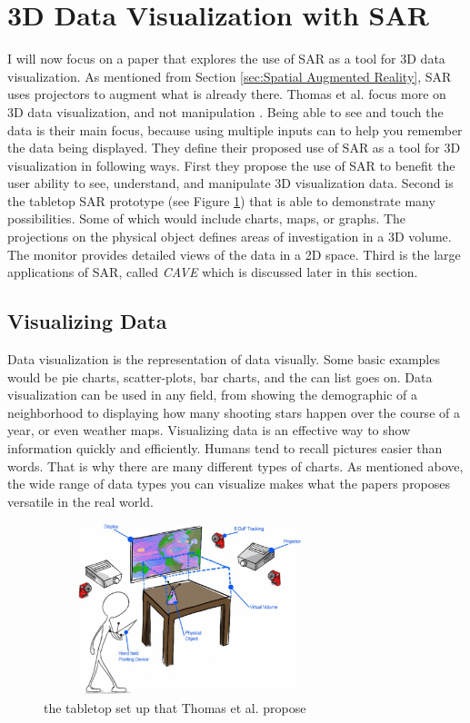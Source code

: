 \documentclass{sig-alternate}
\begin{document}
\section{3D Data Visualization with SAR}
\label{sec:3D Data Visualization}
I will now focus on a paper that explores the use of SAR as a tool for 3D data visualization. As mentioned from Section \ref{sec:Spatial Augmented Reality}, SAR uses projectors to augment what is already there. Thomas et al. focus more on 3D data visualization, and not manipulation \cite{3D}. Being able to see and touch the data is their main focus, because using multiple inputs can to help you remember the data being displayed. They define their proposed use of SAR as a tool for 3D visualization in following ways. First they propose the use of SAR to benefit the user ability to see, understand, and manipulate 3D visualization data. Second is the tabletop SAR prototype (see Figure \ref{fig:Tabletop}) that is able to demonstrate many possibilities. Some of which would include charts, maps, or graphs. The projections on the physical object defines areas of investigation in a 3D volume. The monitor provides detailed views of the data in a 2D space. Third is the large applications of SAR, called \textit{CAVE} which is discussed later in this section.


\subsection{Visualizing Data}
\label{sec:Visualizing Data}
Data visualization is the representation of data visually. Some basic examples would be pie charts, scatter-plots, bar charts, and the can list goes on. Data visualization can be used in any field, from showing the demographic of a neighborhood to displaying how many shooting stars happen over the course of a year, or even weather maps. Visualizing data is an effective way to show information quickly and efficiently. Humans tend to recall pictures easier than words. That is why there are many different types of charts. As mentioned above, the wide range of data types you can visualize makes what the papers proposes versatile in the real world.       

\begin{figure}
	\includegraphics[width=8.5cm, height=5cm]{Tabletop}
	\caption{the tabletop set up that Thomas et al. propose \cite{3D}}
	\label{fig:Tabletop}
\end{figure}
\end{document}
